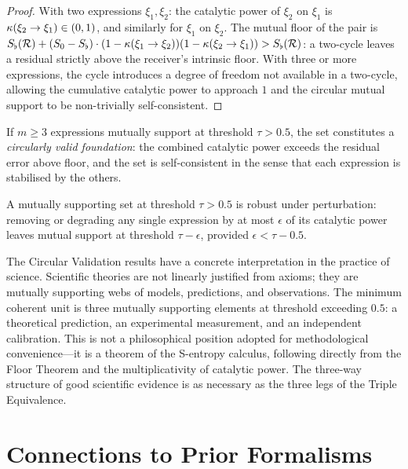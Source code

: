 \begin{proof}
With two expressions $\xi_1, \xi_2$: the catalytic power of $\xi_2$ on $\xi_1$ is $\kappa(\xi_2 \to \xi_1) \in (0,1)$, and similarly for $\xi_1$ on $\xi_2$. The mutual floor of the pair is $S_{\flat}(\mathcal{R}) + (S_0 - S_{\flat}) \cdot (1 - \kappa(\xi_1 \to \xi_2))(1 - \kappa(\xi_2 \to \xi_1)) > S_{\flat}(\mathcal{R})$: a two-cycle leaves a residual strictly above the receiver's intrinsic floor. With three or more expressions, the cycle introduces a degree of freedom not available in a two-cycle, allowing the cumulative catalytic power to approach $1$ and the circular mutual support to be non-trivially self-consistent.
\end{proof}

\begin{theorem}\label{thm:circ-valid-suf}
If $m \geq 3$ expressions mutually support at threshold $\tau > 0.5$, the set constitutes a \emph{circularly valid foundation}: the combined catalytic power exceeds the residual error above floor, and the set is self-consistent in the sense that each expression is stabilised by the others.
\end{theorem}

\begin{corollary}\label{cor:circ-stability}
A mutually supporting set at threshold $\tau > 0.5$ is robust under perturbation: removing or degrading any single expression by at most $\epsilon$ of its catalytic power leaves mutual support at threshold $\tau - \epsilon$, provided $\epsilon < \tau - 0.5$.
\end{corollary}

The Circular Validation results have a concrete interpretation in the practice of science. Scientific theories are not linearly justified from axioms; they are mutually supporting webs of models, predictions, and observations. The minimum coherent unit is three mutually supporting elements at threshold exceeding $0.5$: a theoretical prediction, an experimental measurement, and an independent calibration. This is not a philosophical position adopted for methodological convenience---it is a theorem of the S-entropy calculus, following directly from the Floor Theorem and the multiplicativity of catalytic power. The three-way structure of good scientific evidence is as necessary as the three legs of the Triple Equivalence.


\section{Connections to Prior Formalisms}
\label{sec:connections}

